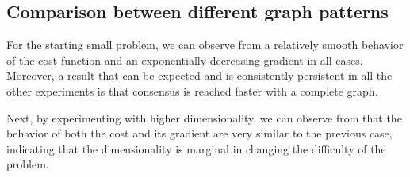\documentclass[a4paper,11pt,oneside]{book}
\begin{document}
\subsection{Comparison between different graph patterns}

For the starting small problem, we can observe from  a relatively smooth behavior of the cost function and an exponentially decreasing gradient in all cases. Moreover, a result that can be expected and is consistently persistent in all the other experiments is that consensus is reached faster with a complete graph.

Next, by experimenting with higher dimensionality, we can observe from  that the behavior of both the cost and its gradient are very similar to the previous case, indicating that the dimensionality is marginal in changing the difficulty of the problem. 
\end{document}
